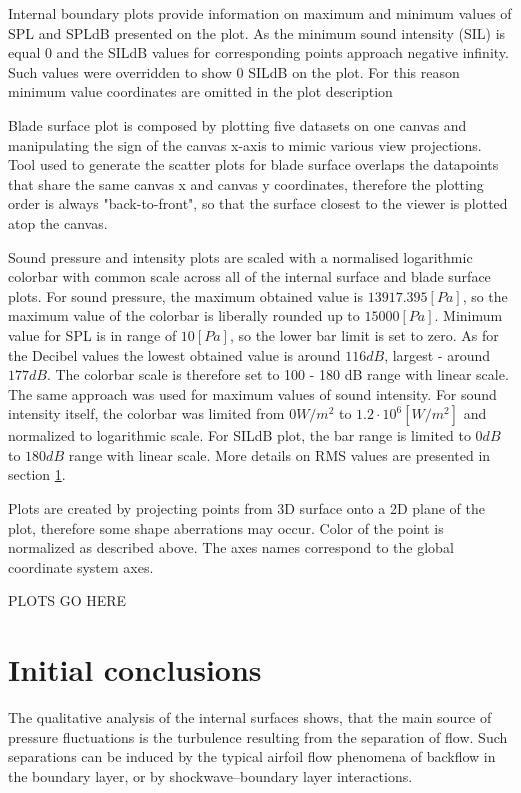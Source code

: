 Internal boundary plots provide information on maximum and minimum values of SPL and SPLdB presented on the plot. As the minimum sound intensity (SIL) is equal 0 and the SILdB values for corresponding points approach negative infinity. Such values were overridden to show 0 SILdB on the plot.    For this reason minimum value coordinates are omitted in the plot description 

Blade surface plot is composed by plotting five datasets on one canvas and manipulating the sign of the canvas x-axis to mimic various view projections. Tool used to generate the scatter plots for blade surface overlaps the datapoints that share the same canvas x and canvas y coordinates, therefore the plotting order is always "back-to-front", so that the surface closest to the viewer is plotted atop the canvas.

Sound pressure and intensity plots are scaled with a normalised logarithmic colorbar with common scale across all of the internal surface and blade surface plots. For sound pressure, the maximum obtained value is $13917.395 [Pa]$, so the maximum value of the colorbar is liberally rounded up to $15000 [Pa]$. Minimum value for SPL is in range of $10 [Pa]$, so the lower bar limit is set to zero. As for the Decibel values the lowest obtained value is around $116 dB$, largest - around $177 dB$. The colorbar scale is therefore set to 100 - 180 dB range with linear scale. The same approach was used for maximum values of sound intensity. For sound intensity itself, the colorbar was limited from $0 W/m^2$ to $1.2 \cdot 10^6 [W/m^2]$ and normalized to logarithmic scale. For SILdB plot, the bar range is limited to $0 dB$ to $180 dB$ range with linear scale. More details on RMS values are presented in section \ref{quantresults}. 

Plots are created by projecting points from 3D surface onto a 2D plane of the plot, therefore some shape aberrations may occur. Color of the point is normalized as described above. The axes names correspond to the global coordinate system axes. 

PLOTS GO HERE


\section{Initial conclusions} \label{quantresults}
The qualitative analysis of the internal surfaces shows, that the main source of pressure fluctuations is the turbulence resulting from the separation of flow. Such separations can be induced by the typical airfoil flow phenomena of backflow in the boundary layer, or by shockwave--boundary layer interactions. 
